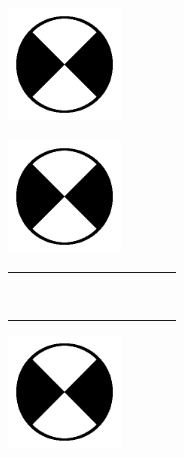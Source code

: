 \documentclass[a4paper, 12pt]{article}
\begin{document}
\newcommand{\magic}{1cm}

\begin{flushleft}
\includegraphics[width=3cm, height=3cm]{anchor.jpg} 
\end{flushleft}

\begin{flushright}
\includegraphics[width=3cm, height=3cm]{anchor.jpg}
\end{flushright}

\setlength\minrowclearance{\magic}

\newcommand{\cell}{\cellcolor{red}}

\begin{center}
\begin{tabular}{|p{\magic}|p{\magic}|p{\magic}|p{\magic}|p{\magic}|p{\magic}|p{\magic}|p{\magic}|p{\magic}|p{\magic}|p{\magic}|p{\magic}|}
	\hline
	 \cell&\cell&\cell&\cell&\cell&\cell &\cell&\cell&\cell&\cell&\cell &\cell \\ \hline
	 \cell&\cell&\cell&\cell&\cell&\cell &\cell&\cell&\cell&\cell&\cell &\cell \\ \hline
	 \cell&\cell&\cell&\cell&\cell&\cell &\cell&\cell&\cell&\cell&\cell &\cell \\ \hline
	 \cell&\cell&\cell&\cell&\cell&\cell &\cell&\cell&\cell&\cell&\cell &\cell \\ \hline
	 \cell&\cell&\cell&\cell&\cell&\cell &\cell&\cell&\cell&\cell&\cell &\cell \\ \hline
	 \cell&\cell&\cell&\cell&\cell&\cell &\cell&\cell&\cell&\cell&\cell &\cell \\ \hline
	 \cell&\cell&\cell&\cell&\cell&\cell &\cell&\cell&\cell&\cell&\cell &\cell \\ \hline
	 \cell&\cell&\cell&\cell&\cell&\cell &\cell&\cell&\cell&\cell&\cell &\cell \\ \hline
	 \cell&\cell&\cell&\cell&\cell&\cell &\cell&\cell&\cell&\cell&\cell &\cell \\ \hline
	 \cell&\cell&\cell&\cell&\cell&\cell &\cell&\cell&\cell&\cell&\cell &\cell \\ \hline
\end{tabular}
\end{center}

\begin{flushleft}
\includegraphics[width=3cm, height=3cm]{anchor.jpg}
\end{flushleft}
\end{document}
